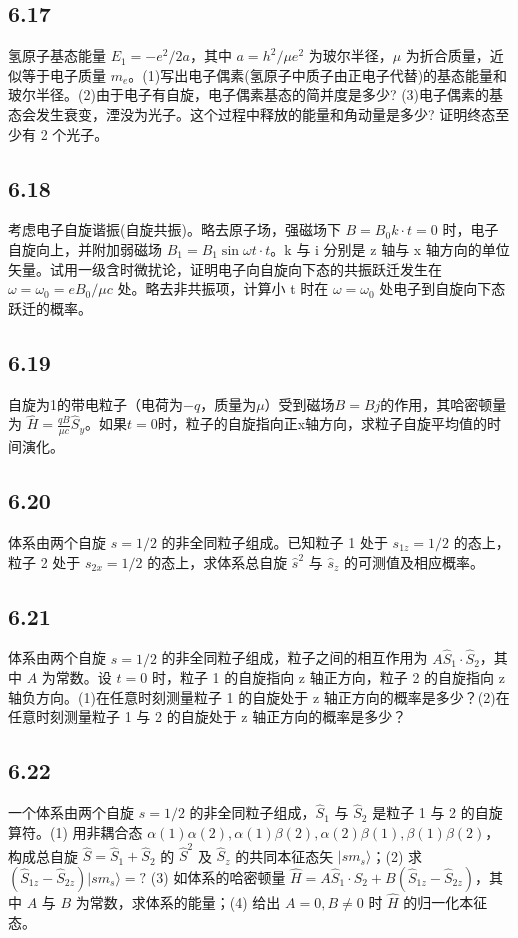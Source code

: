 \subsection{6.17}
氢原子基态能量 $E_1 = -e^2 / 2a$，其中 $a = h^2 / \mu e^2$ 为玻尔半径，$\mu$ 为折合质量，近似等于电子质量 $m_e$。(1)写出电子偶素(氢原子中质子由正电子代替)的基态能量和玻尔半径。(2)由于电子有自旋，电子偶素基态的简并度是多少? (3)电子偶素的基态会发生衰变，湮没为光子。这个过程中释放的能量和角动量是多少? 证明终态至少有 2 个光子。

\subsection{6.18}
考虑电子自旋谐振(自旋共振)。略去原子场，强磁场下 $B = B_0 k \cdot t = 0$ 时，电子自旋向上，并附加弱磁场 $B_1 = B_1 \sin \omega t \cdot t$。k 与 i 分别是 z 轴与 x 轴方向的单位矢量。试用一级含时微扰论，证明电子向自旋向下态的共振跃迁发生在 $\omega = \omega_0 = eB_0 / \mu c$ 处。略去非共振项，计算小 t 时在 $\omega = \omega_0$ 处电子到自旋向下态跃迁的概率。

\subsection{6.19}
自旋为1的带电粒子（电荷为$-q$，质量为$\mu$）受到磁场$B = Bj$的作用，其哈密顿量为 $\hat{H} = \frac{qB}{\mu c} \hat{S}_y$。如果$t = 0$时，粒子的自旋指向正x轴方向，求粒子自旋平均值的时间演化。

\subsection{6.20}
体系由两个自旋 $s = 1/2$ 的非全同粒子组成。已知粒子 1 处于 $s_{1z} = 1/2$ 的态上，粒子 2 处于 $s_{2x} = 1/2$ 的态上，求体系总自旋 $\hat{s}^2$ 与 $\hat{s}_z$ 的可测值及相应概率。

\subsection{6.21}
体系由两个自旋 $s = 1/2$ 的非全同粒子组成，粒子之间的相互作用为 $A\hat{S}_1 \cdot \hat{S}_2$，其中 $A$ 为常数。设 $t = 0$ 时，粒子 1 的自旋指向 z 轴正方向，粒子 2 的自旋指向 z 轴负方向。(1)在任意时刻测量粒子 1 的自旋处于 z 轴正方向的概率是多少？(2)在任意时刻测量粒子 1 与 2 的自旋处于 z 轴正方向的概率是多少？

\subsection{6.22}
一个体系由两个自旋 $s = 1/2$ 的非全同粒子组成，$\hat{S}_1$ 与 $\hat{S}_2$ 是粒子 1 与 2 的自旋算符。(1) 用非耦合态 $\alpha(1)\alpha(2), \alpha(1)\beta(2), \alpha(2)\beta(1), \beta(1)\beta(2)$，构成总自旋 $\hat{S} = \hat{S}_1 + \hat{S}_2$ 的 $\hat{S}^2$ 及 $\hat{S}_z$ 的共同本征态矢 $|sm_s\rangle$；(2) 求 $(\hat{S}_{1z} - \hat{S}_{2z})|sm_s\rangle = ?$ (3) 如体系的哈密顿量 $\hat{H} = A\hat{S}_1 \cdot \hat{S}_2 + B(\hat{S}_{1z} - \hat{S}_{2z})$，其中 $A$ 与 $B$ 为常数，求体系的能量；(4) 给出 $A = 0, B \neq 0$ 时 $\hat{H}$ 的归一化本征态。

